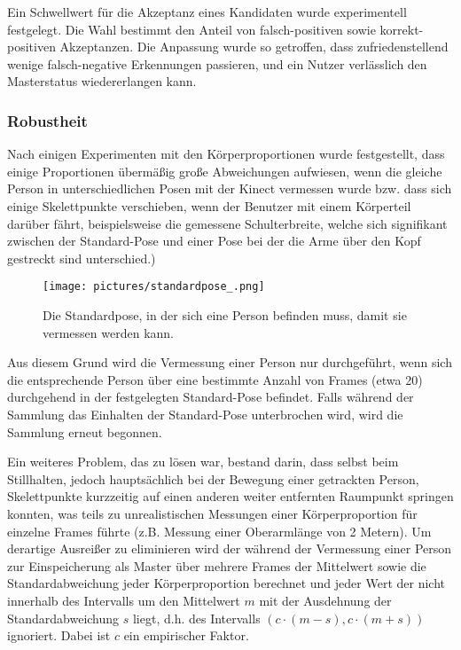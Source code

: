 Ein Schwellwert für die Akzeptanz eines Kandidaten wurde experimentell festgelegt.
Die Wahl bestimmt den Anteil von falsch-positiven sowie korrekt-positiven Akzeptanzen.
Die Anpassung wurde so getroffen, dass zufriedenstellend wenige falsch-negative Erkennungen passieren, 
und ein Nutzer verlässlich den Masterstatus wiedererlangen kann.









\subsubsection{Robustheit}
Nach einigen Experimenten mit den Körperproportionen wurde festgestellt, dass einige Proportionen übermäßig große Abweichungen aufwiesen, wenn die gleiche Person in unterschiedlichen Posen mit der Kinect vermessen wurde bzw. dass sich einige Skelettpunkte \glqq{}verschieben\grqq{}, wenn der Benutzer mit einem Körperteil darüber fährt, beispielsweise die gemessene Schulterbreite, welche sich signifikant zwischen der Standard-Pose und einer Pose bei der die Arme über den Kopf gestreckt sind unterschied.)
\begin{figure}[h!]
		\centering
		\texttt{[image: pictures/standardpose\_.png]}
		\caption{Die Standardpose, in der sich eine Person befinden muss, damit sie vermessen werden kann.}\label{fig:standardp}
		\end{figure}
Aus diesem Grund wird die Vermessung einer Person nur durchgeführt, wenn sich die entsprechende Person über eine bestimmte Anzahl von Frames (etwa 20) durchgehend in der festgelegten Standard-Pose befindet. Falls während der Sammlung das Einhalten der Standard-Pose unterbrochen wird, wird die Sammlung erneut begonnen.\par
Ein weiteres Problem, das zu lösen war, bestand darin, dass selbst beim Stillhalten, jedoch hauptsächlich bei der Bewegung einer getrackten Person, Skelettpunkte kurzzeitig auf einen anderen weiter entfernten Raumpunkt springen konnten, was teils zu unrealistischen Messungen einer Körperproportion für einzelne Frames führte (z.B. Messung einer Oberarmlänge von 2 Metern). Um derartige Ausreißer zu eliminieren wird der während der Vermessung einer Person zur Einspeicherung als Master über mehrere Frames der Mittelwert sowie die Standardabweichung jeder Körperproportion berechnet und jeder Wert der nicht innerhalb des Intervalls um den Mittelwert $m$ mit der Ausdehnung der Standardabweichung $s$ liegt, d.h. des Intervalls $(c\cdot(m-s),c\cdot(m+s))$ ignoriert. Dabei ist $c$ ein empirischer Faktor.\par
